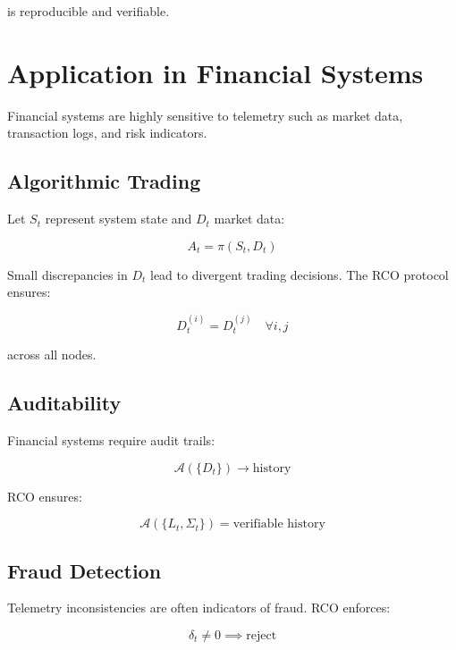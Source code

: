 is reproducible and verifiable.

\section{Application in Financial Systems}

Financial systems are highly sensitive to telemetry such as market data, transaction logs, and risk indicators.

\subsection{Algorithmic Trading}

Let $S_t$ represent system state and $D_t$ market data:

\begin{equation}
A_t = \pi(S_t, D_t)
\end{equation}

Small discrepancies in $D_t$ lead to divergent trading decisions. The RCO protocol ensures:

\begin{equation}
D_t^{(i)} = D_t^{(j)} \quad \forall i,j
\end{equation}

across all nodes.

\subsection{Auditability}

Financial systems require audit trails:

\begin{equation}
\mathcal{A}(\{D_t\}) \rightarrow \text{history}
\end{equation}

RCO ensures:

\begin{equation}
\mathcal{A}(\{L_t, \Sigma_t\}) = \text{verifiable history}
\end{equation}

\subsection{Fraud Detection}

Telemetry inconsistencies are often indicators of fraud. RCO enforces:

\begin{equation}
\delta_t \neq 0 \implies \text{reject}
\end{equation}

